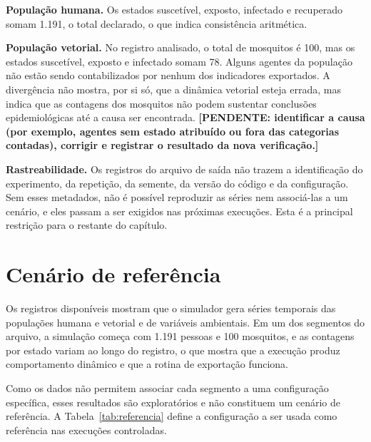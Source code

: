 \textbf{População humana.} Os estados suscetível, exposto, infectado e recuperado somam 1.191, o total declarado, o que indica consistência aritmética.

\textbf{População vetorial.} No registro analisado, o total de mosquitos é 100, mas os estados suscetível, exposto e infectado somam 78. Alguns agentes da população não estão sendo contabilizados por nenhum dos indicadores exportados. A divergência não mostra, por si só, que a dinâmica vetorial esteja errada, mas indica que as contagens dos mosquitos não podem sustentar conclusões epidemiológicas até a causa ser encontrada. \textbf{[PENDENTE: identificar a causa (por exemplo, agentes sem estado atribuído ou fora das categorias contadas), corrigir e registrar o resultado da nova verificação.]}

\textbf{Rastreabilidade.} Os registros do arquivo de saída não trazem a identificação do experimento, da repetição, da semente, da versão do código e da configuração. Sem esses metadados, não é possível reproduzir as séries nem associá-las a um cenário, e eles passam a ser exigidos nas próximas execuções. Esta é a principal restrição para o restante do capítulo.

\section{Cenário de referência}

Os registros disponíveis mostram que o simulador gera séries temporais das populações humana e vetorial e de variáveis ambientais. Em um dos segmentos do arquivo, a simulação começa com 1.191 pessoas e 100 mosquitos, e as contagens por estado variam ao longo do registro, o que mostra que a execução produz comportamento dinâmico e que a rotina de exportação funciona.

Como os dados não permitem associar cada segmento a uma configuração específica, esses resultados são exploratórios e não constituem um cenário de referência. A Tabela~\ref{tab:referencia} define a configuração a ser usada como referência nas execuções controladas.

